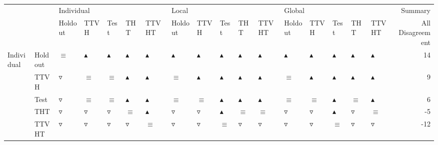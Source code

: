 \begin{table}
\centering
\label{tab:statistical_similar_sets_performance_disagreement_all}
\begin{tabular}{lllllllllllllllllr}
\toprule
       &       & \multicolumn{5}{l}{Individual} & \multicolumn{5}{l}{Local} & \multicolumn{5}{l}{Global} &          Summary \\
       &       &          Holdout &              TTVH &              Test &               THT &             TTVHT &           Holdout &              TTVH &              Test &               THT &             TTVHT &           Holdout &              TTVH &              Test &               THT &             TTVHT & All Disagreement \\
\midrule
Individual & Holdout &         $\equiv$ &  $\blacktriangle$ &  $\blacktriangle$ &  $\blacktriangle$ &  $\blacktriangle$ &  $\blacktriangle$ &  $\blacktriangle$ &  $\blacktriangle$ &  $\blacktriangle$ &  $\blacktriangle$ &  $\blacktriangle$ &  $\blacktriangle$ &  $\blacktriangle$ &  $\blacktriangle$ &  $\blacktriangle$ &               14 \\
       & TTVH &  $\triangledown$ &          $\equiv$ &          $\equiv$ &  $\blacktriangle$ &  $\blacktriangle$ &          $\equiv$ &  $\blacktriangle$ &  $\blacktriangle$ &  $\blacktriangle$ &  $\blacktriangle$ &          $\equiv$ &  $\blacktriangle$ &  $\blacktriangle$ &  $\blacktriangle$ &  $\blacktriangle$ &                9 \\
       & Test &  $\triangledown$ &          $\equiv$ &          $\equiv$ &  $\blacktriangle$ &  $\blacktriangle$ &          $\equiv$ &          $\equiv$ &  $\blacktriangle$ &  $\blacktriangle$ &  $\blacktriangle$ &          $\equiv$ &          $\equiv$ &  $\blacktriangle$ &          $\equiv$ &  $\blacktriangle$ &                6 \\
       & THT &  $\triangledown$ &   $\triangledown$ &   $\triangledown$ &          $\equiv$ &  $\blacktriangle$ &   $\triangledown$ &   $\triangledown$ &  $\blacktriangle$ &          $\equiv$ &          $\equiv$ &   $\triangledown$ &   $\triangledown$ &  $\blacktriangle$ &   $\triangledown$ &          $\equiv$ &               -5 \\
       & TTVHT &  $\triangledown$ &   $\triangledown$ &   $\triangledown$ &   $\triangledown$ &          $\equiv$ &   $\triangledown$ &   $\triangledown$ &          $\equiv$ &   $\triangledown$ &   $\triangledown$ &   $\triangledown$ &   $\triangledown$ &          $\equiv$ &   $\triangledown$ &   $\triangledown$ &              -12 \\

\end{tabular}
\end{table}
